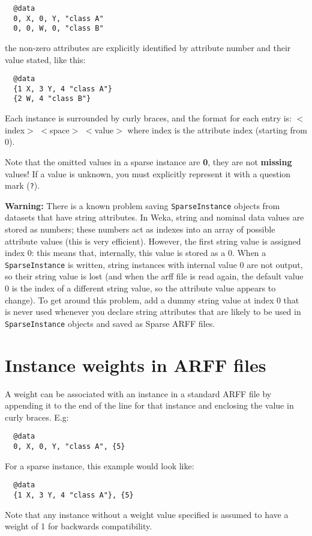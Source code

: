 \begin{verbatim}
  @data
  0, X, 0, Y, "class A"
  0, 0, W, 0, "class B"
\end{verbatim}

\noindent the non-zero attributes are explicitly identified by attribute number and their value stated, like this:

\begin{verbatim}
  @data
  {1 X, 3 Y, 4 "class A"}
  {2 W, 4 "class B"}
\end{verbatim}

\noindent Each instance is surrounded by curly braces, and the format for each entry is: $<$index$>$ $<$space$>$ $<$value$>$ where index is the attribute index (starting from 0).

Note that the omitted values in a sparse instance are \textbf{0}, they are not \textbf{missing} values! If a value is unknown, you must explicitly represent it with a question mark (\texttt{?}).

\textbf{Warning:} There is a known problem saving \texttt{SparseInstance} objects from datasets that have string attributes. In Weka, string and nominal data values are stored as numbers; these numbers act as indexes into an array of possible attribute values (this is very efficient). However, the first string value is assigned index 0: this means that, internally, this value is stored as a 0. When a \texttt{SparseInstance} is written, string instances with internal value 0 are not output, so their string value is lost (and when the arff file is read again, the default value 0 is the index of a different string value, so the attribute value appears to change). To get around this problem, add a dummy string value at index 0 that is never used whenever you declare string attributes that are likely to be used in \texttt{SparseInstance} objects and saved as Sparse ARFF files.

\section{Instance weights in ARFF files}
A weight can be associated with an instance in a standard ARFF file by appending it to the end of the line for that instance and enclosing the value in curly braces. E.g:

\begin{verbatim}
  @data
  0, X, 0, Y, "class A", {5}
\end{verbatim}

\noindent For a sparse instance, this example would look like:

\begin{verbatim}
  @data
  {1 X, 3 Y, 4 "class A"}, {5}
\end{verbatim}

\noindent Note that any instance without a weight value specified is assumed to have a weight of 1 for backwards compatibility.

